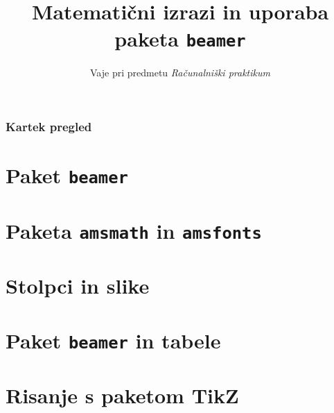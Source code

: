 \documentclass{beamer}
\begin{document}
    
    \begin{frame}
    
        \title{Matematični izrazi in uporaba paketa \texttt{beamer}}
        \subtitle{Vaje pri predmetu \emph{Računalniški praktikum}}
        \date{}
        \titlepage
    \end{frame}
 



\begin{frame}
    \frametitle{Kartek pregled}
    \tableofcontents
\end{frame}

\section{Paket \texttt{beamer}}


\section{Paketa \texttt{amsmath} in \texttt{amsfonts}}


\section{Stolpci in slike}


\section{Paket \texttt{beamer} in tabele}


\section{Risanje s paketom TikZ}
\end{document}
